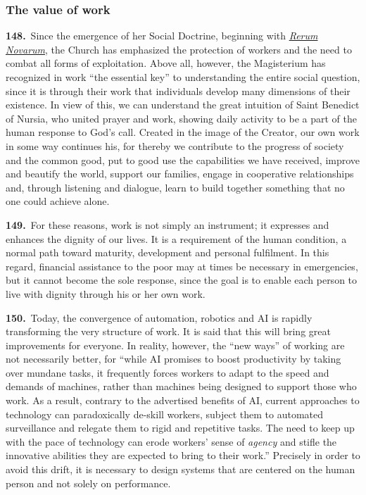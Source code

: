 \documentclass{article}
\begin{document}
\subsubsection{The value of work}

\textbf{148.}\ Since the emergence of her Social Doctrine, beginning with \href{https://www.vatican.va/content/leo-xiii/en/encyclicals/documents/hf_l-xiii_enc_15051891_rerum-novarum.html}{\emph{Rerum Novarum}}, the Church has emphasized the protection of workers and the need to combat all forms of exploitation. Above all, however, the Magisterium has recognized in work ``the essential key''\cite{n150} to understanding the entire social question, since it is through their work that individuals develop many dimensions of their existence. In view of this, we can understand the great intuition of Saint Benedict of Nursia, who united prayer and work, showing daily activity to be a part of the human response to God's call. Created in the image of the Creator, our own work in some way continues his, for thereby we contribute to the progress of society and the common good, put to good use the capabilities we have received, improve and beautify the world, support our families, engage in cooperative relationships and, through listening and dialogue, learn to build together something that no one could achieve alone.

\textbf{149.}\ For these reasons, work is not simply an instrument; it expresses and enhances the dignity of our lives. It is a requirement of the human condition, a normal path toward maturity, development and personal fulfilment. In this regard, financial assistance to the poor may at times be necessary in emergencies, but it cannot become the sole response, since the goal is to enable each person to live with dignity through his or her own work.\cite{n151}

\textbf{150.}\ Today, the convergence of automation, robotics and AI is rapidly transforming the very structure of work. It is said that this will bring great improvements for everyone. In reality, however, the ``new ways'' of working are not necessarily better, for ``while AI promises to boost productivity by taking over mundane tasks, it frequently forces workers to adapt to the speed and demands of machines, rather than machines being designed to support those who work. As a result, contrary to the advertised benefits of AI, current approaches to technology can paradoxically de-skill workers, subject them to automated surveillance and relegate them to rigid and repetitive tasks. The need to keep up with the pace of technology can erode workers' sense of \emph{agency} and stifle the innovative abilities they are expected to bring to their work.''\cite{n152} Precisely in order to avoid this drift, it is necessary to design systems that are centered on the human person and not solely on performance.
\end{document}
